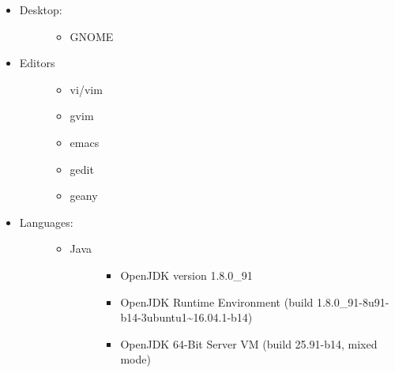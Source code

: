 \documentclass[letterpaper,11pt,english]{sphinxmanual}
\begin{document}
\begin{itemize}
\begin{description}
\begin{itemize}
\begin{description}
\begin{itemize}
\end{itemize}

\end{description}

\item {} \begin{description}
\item[{Desktop:}] \leavevmode\begin{itemize}
\item {} 
GNOME

\end{itemize}

\end{description}

\item {} \begin{description}
\item[{Editors}] \leavevmode\begin{itemize}
\item {} 
vi/vim

\item {} 
gvim

\item {} 
emacs

\item {} 
gedit

\item {} 
geany

\end{itemize}

\end{description}

\item {} \begin{description}
\item[{Languages:}] \leavevmode\begin{itemize}
\item {} \begin{description}
\item[{Java}] \leavevmode\begin{itemize}
\item {} 
OpenJDK version 1.8.0\_91

\item {} 
OpenJDK Runtime Environment (build 1.8.0\_91-8u91-b14-3ubuntu1\textasciitilde{}16.04.1-b14)

\item {} 
OpenJDK 64-Bit Server VM (build 25.91-b14, mixed mode)

\end{itemize}


\end{description}
\end{itemize}
\end{description}
\end{itemize}
\end{description}
\end{itemize}
\end{document}
